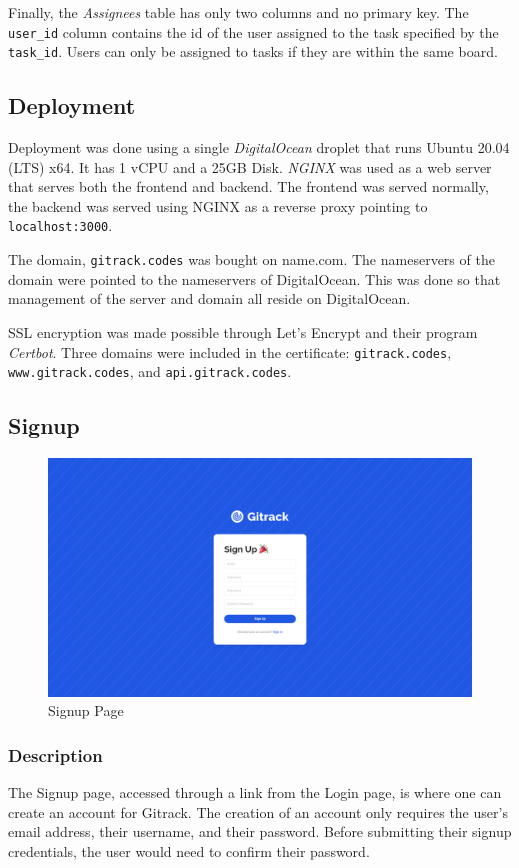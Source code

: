 \documentclass{article}
\def\code#1{\texttt{#1}}
\begin{document}
Finally, the \emph{Assignees} table has only two columns and no primary key. The
\code{user\_id} column contains the id of the user assigned to the task
specified by the \code{task\_id}. Users can only be assigned to tasks if they
are within the same board.

\subsection{Deployment}
Deployment was done using a single \emph{DigitalOcean} droplet that runs Ubuntu
20.04 (LTS) x64. It has 1 vCPU and a 25GB Disk. \emph{NGINX} was used as a web
server that serves both the frontend and backend. The frontend was served
normally, the backend was served using NGINX as a reverse proxy pointing to
\code{localhost:3000}.

The domain, \code{gitrack.codes} was bought on name.com. The nameservers of the
domain were pointed to the nameservers of DigitalOcean. This was done so that
management of the server and domain all reside on DigitalOcean.

SSL encryption was made possible through Let’s Encrypt and their program
\emph{Certbot}. Three domains were included in the certificate:
\code{gitrack.codes}, \code{www.gitrack.codes}, and \code{api.gitrack.codes}.


\subsection{Signup}
\begin{figure}[H]
	\includegraphics[width=1\textwidth]{signup}\par\vspace{0.5cm}
	\caption{Signup Page}
	\label{fig:signup}
\end{figure}
\subsubsection{Description}
The Signup page, accessed through a link from the Login page, is where one can
create an account for Gitrack. The creation of an account only requires the
user’s email address, their username, and their password. Before submitting
their signup credentials, the user would need to confirm their password.
\end{document}

